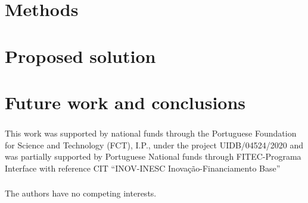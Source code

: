 \documentclass[runningheads]{llncs}
\begin{document}

\section{Methods}
\label{sec:methods}


\section{Proposed solution}
\label{sec:solution}


\section{Future work and conclusions}
\label{sec:conclusions}

\begin{credits}
\subsubsection{\ackname} This work was supported by national funds through the Portuguese Foundation for Science and Technology (FCT), I.P., under the project UIDB/04524/2020 and was partially supported by Portuguese National funds through FITEC-Programa Interface with reference CIT “INOV-INESC Inovação-Financiamento Base”

\subsubsection{\discintname}
The authors have no competing interests.
\end{credits}
%
%
%


%
\end{document}
